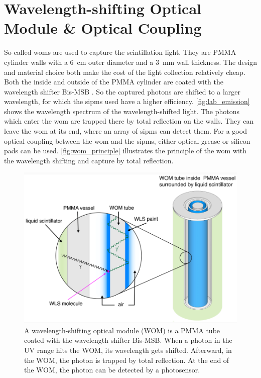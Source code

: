 \section{Wavelength-shifting Optical Module \& Optical Coupling}

So-called \acp{wom} are used to capture the scintillation light.
They are PMMA cylinder walls with a \SI{6}{\centi\meter} outer diameter and a \SI{3}{\milli\meter} wall thickness.
The design and material choice both make the cost of the light collection relatively cheap.
Both the inside and outside of the PMMA cylinder are coated with the wavelength shifter Bis-MSB \cite{wspaint}.
So the captured photons are shifted to a larger wavelength, for which the \acp{sipm} used have a higher efficiency.
\autoref{fig:lab_emission} shows the wavelength spectrum of the wavelength-shifted light.
The photons which enter the \ac{wom} are trapped there by total reflection on the walls.
They can leave the \ac{wom} at its end, where an array of \acp{sipm} can detect them.
For a good optical coupling between the \ac{wom} and the \acp{sipm}, either optical grease or silicon pads can be used.
\autoref{fig:wom_principle} illustrates the principle of the \ac{wom} with the wavelength shifting and capture by total reflection.
\begin{figure}
	\centering
	\includegraphics[width=.8\textwidth]{pictures/wom_principle}
	\caption[Working principle of a WOM]{A wavelength-shifting optical module (WOM) is a PMMA tube coated with the wavelength shifter Bis-MSB. When a photon in the UV range hits the WOM, its wavelength gets shifted. Afterward, in the WOM, the photon is trapped by total reflection. At the end of the WOM, the photon can be detected by a photosensor. \cite{Zimmermann}}
	\label{fig:wom_principle}
\end{figure}

